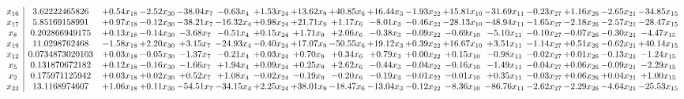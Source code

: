 \documentclass[9pt]{article}
\begin{document}
 \[\begin{array}{c| c c@{\hskip 2pt} c@{\hskip 2pt} c@{\hskip 2pt} c@{\hskip 2pt} c@{\hskip 2pt} c@{\hskip 2pt} c@{\hskip 2pt} c@{\hskip 2pt} c@{\hskip 2pt} c@{\hskip 2pt} c@{\hskip 2pt} c@{\hskip 2pt} c@{\hskip 2pt} c@{\hskip 2pt} c@{\hskip 2pt} }
 x_{16}   &  3.62222465826 & +  0.54 x_{18} & -2.52 x_{30} & -38.04 x_{7} & -0.63 x_{4} & +  1.53 x_{24} & + 13.62 x_{9} & + 40.85 x_{6} & + 16.44 x_{3} & -1.93 x_{22} & + 15.81 x_{10} & -31.69 x_{11} & -0.23 x_{27} & +  1.16 x_{26} & -2.65 x_{21} & -34.85 x_{15}\\
 x_{17}   &  5.85169158991 & +  0.97 x_{18} & -0.12 x_{30} & -38.21 x_{7} & -16.32 x_{4} & +  0.98 x_{24} & + 21.71 x_{9} & +  1.17 x_{6} & -8.01 x_{3} & -0.46 x_{22} & -28.13 x_{10} & -48.94 x_{11} & -1.65 x_{27} & -2.18 x_{26} & -2.57 x_{21} & -28.47 x_{15}\\
 x_{8}   &  0.202866949175 & +  0.13 x_{18} & -0.14 x_{30} & -3.68 x_{7} & -0.51 x_{4} & +  0.15 x_{24} & +  1.71 x_{9} & +  2.06 x_{6} & -0.38 x_{3} & -0.09 x_{22} & -0.69 x_{10} & -5.10 x_{11} & -0.10 x_{27} & -0.07 x_{26} & -0.30 x_{21} & -4.47 x_{15}\\
 x_{19}   &  11.0298762468 & -1.58 x_{18} & +  2.20 x_{30} & +  3.15 x_{7} & -24.93 x_{4} & -0.40 x_{24} & + 17.07 x_{9} & -50.55 x_{6} & + 19.12 x_{3} & +  0.39 x_{22} & + 16.67 x_{10} & +  3.51 x_{11} & -1.14 x_{27} & +  0.51 x_{26} & -0.62 x_{21} & + 40.14 x_{15}\\
 x_{12}   &  0.0734873020103 & +  0.03 x_{18} & -0.05 x_{30} & -1.37 x_{7} & -0.21 x_{4} & +  0.03 x_{24} & +  0.70 x_{9} & +  0.34 x_{6} & +  0.79 x_{3} & +  0.00 x_{22} & +  0.15 x_{10} & -0.98 x_{11} & -0.02 x_{27} & +  0.01 x_{26} & -0.13 x_{21} & -1.24 x_{15}\\
 x_{5}   &  0.131870672182 & +  0.12 x_{18} & -0.16 x_{30} & -1.66 x_{7} & +  1.94 x_{4} & +  0.09 x_{24} & +  0.25 x_{9} & +  2.62 x_{6} & -0.44 x_{3} & -0.04 x_{22} & -0.16 x_{10} & -1.49 x_{11} & -0.04 x_{27} & +  0.06 x_{26} & -0.09 x_{21} & -2.29 x_{15}\\
 x_{2}   &  0.175971125942 & +  0.03 x_{18} & +  0.02 x_{30} & +  0.52 x_{7} & +  1.08 x_{4} & -0.02 x_{24} & -0.19 x_{9} & -0.20 x_{6} & -0.19 x_{3} & -0.01 x_{22} & -0.01 x_{10} & +  0.35 x_{11} & -0.03 x_{27} & +  0.06 x_{26} & +  0.04 x_{21} & +  1.00 x_{15}\\
 x_{23}   &  13.1168974607 & +  1.06 x_{18} & +  0.11 x_{30} & -54.51 x_{7} & -34.15 x_{4} & +  2.25 x_{24} & + 38.01 x_{9} & -18.47 x_{6} & -13.04 x_{3} & -0.12 x_{22} & -8.36 x_{10} & -86.76 x_{11} & -2.62 x_{27} & -2.29 x_{26} & -4.64 x_{21} & -25.53 x_{15}\\

\end{array}\]
\end{document}
